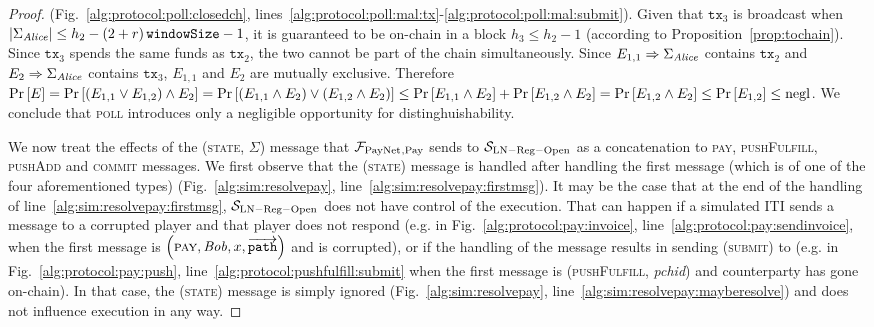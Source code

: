 \begin{proof}
  (Fig.~\ref{alg:protocol:poll:closedch},
  lines~\ref{alg:protocol:poll:mal:tx}-\ref{alg:protocol:poll:mal:submit}).
  Given that $\mathtt{tx}_3$ is broadcast when $|\Sigma_{\mathit{Alice}}| \leq h_2 -
  \left(2 + r\right)\texttt{windowSize}{} - 1$, it is guaranteed to be on-chain in a block $h_3 \leq h_2 - 1$
  (according to Proposition~\ref{prop:tochain}). Since $\mathtt{tx}_3$ spends
  the same funds as $\mathtt{tx}_2$, the two cannot be part of the chain
  simultaneously. Since $E_{1,1} \Rightarrow \Sigma_{\mathit{Alice}}$ contains
  $\mathtt{tx}_2$ and $E_2 \Rightarrow \Sigma_{\mathit{Alice}}$ contains
  $\mathtt{tx}_3$, $E_{1,1}$ and $E_2$ are mutually exclusive. Therefore
  $\Pr\left[E\right] = \Pr\left[\left(E_{1,1} \vee E_{1,2}\right) \wedge
  E_2\right] = \Pr\left[\left(E_{1,1} \wedge E_2\right) \vee \left(E_{1,2}
  \wedge E_2\right)\right] \leq \Pr\left[E_{1,1} \wedge E_2\right] +
  \Pr\left[E_{1,2} \wedge E_2\right] = \Pr\left[E_{1,2} \wedge E_2\right] \leq
  \Pr\left[E_{1,2}\right] \leq \text{negl}$. We conclude that \textsc{poll} introduces
  only a negligible opportunity for distinghuishability.

  We now treat the effects of the (\textsc{state}, $\Sigma$) message that
  $\mathcal{F}_{\mathrm{PayNet}}{}_{\mathrm{, Pay}}$ sends to $\mathcal{S}_{\mathrm{LN - Reg - Open}}$
  as a concatenation to \textsc{pay}, \textsc{pushFulfill}, \textsc{pushAdd} and
  \textsc{commit} messages. We first observe that the (\textsc{state}) message
  is handled after handling the first message (which is of one of the four
  aforementioned types) (Fig.~\ref{alg:sim:resolvepay},
  line~\ref{alg:sim:resolvepay:firstmsg}). It may be the case that at the end of
  the handling of line~\ref{alg:sim:resolvepay:firstmsg},
  $\mathcal{S}_{\mathrm{LN - Reg - Open}}$ does not have control of the
  execution. That can happen if a simulated ITI sends a message to a corrupted
  player and that player does not respond (e.g. in
  Fig.~\ref{alg:protocol:pay:invoice}, line~\ref{alg:protocol:pay:sendinvoice},
  when the first message is $\left(\textsc{pay}, \mathit{Bob}, x,
  \overrightarrow{\mathtt{path}}\right)$ and \bob{} is corrupted), or if the
  handling of the message results in sending (\textsc{submit}) to \ledger{}
  (e.g. in Fig.~\ref{alg:protocol:pay:push},
  line~\ref{alg:protocol:pushfulfill:submit} when the first message is
  (\textsc{pushFulfill}, \textit{pchid}) and counterparty has gone on-chain). In
  that case, the (\textsc{state}) message is simply ignored
  (Fig.~\ref{alg:sim:resolvepay}, line~\ref{alg:sim:resolvepay:mayberesolve})
  and does not influence execution in any way.


\end{proof}
